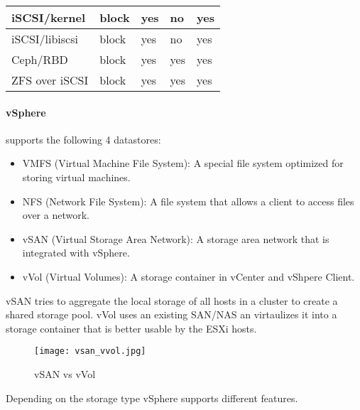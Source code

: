\begin{table}[H]
\begin{tabular}{|l|l|l|l|l|}
        iSCSI/kernel          & block          & yes             & no                 & yes             \\ \hline
        iSCSI/libiscsi        & block          & yes             & no                 & yes             \\ \hline
        Ceph/RBD              & block          & yes             & yes                & yes             \\ \hline
        ZFS over iSCSI        & block          & yes             & yes                & yes             \\ \hline
    \end{tabular}
\end{table}

\paragraph{vSphere} supports the following 4 datastores:

\begin{itemize}
    \item VMFS (Virtual Machine File System): A special file system optimized for storing virtual machines.
    \item NFS (Network File System): A file system that allows a client to access files over a network.
    \item vSAN (Virtual Storage Area Network): A storage area network that is integrated with vSphere.
    \item vVol (Virtual Volumes): A storage container in vCenter and vShpere Client.
\end{itemize}

vSAN tries to aggregate the local storage of all hosts in a cluster to create a shared storage pool. vVol uses an existing SAN/NAS an virtaulizes it into a storage container that is better usable by the ESXi hosts.

\begin{figure}[H]
    \centering
	\texttt{[image: vsan\_vvol.jpg]} %
	\caption{vSAN vs vVol} %
	\label{fig:vSAN_vs_vVol} %
\end{figure}

Depending on the storage type vSphere supports different features.


